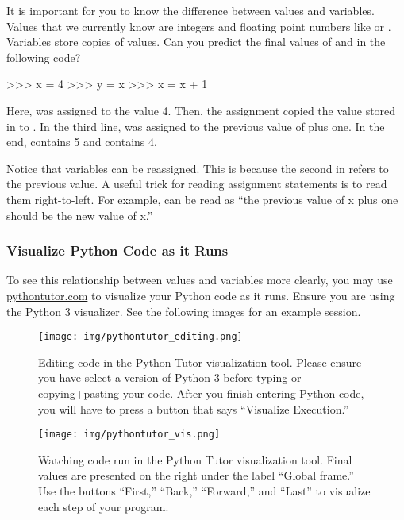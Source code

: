 \documentclass[11pt]{cselabheader}
\begin{document}
It is important for you to know the difference between values and
variables.  Values that we currently know are integers and floating
point numbers like  or .
Variables store copies of values. Can you predict the final values of
 and  in the following code?

\begin{pyconcode}
>>> x = 4
>>> y = x
>>> x = x + 1

\end{pyconcode}

Here,  was assigned to the value 4.
Then, the assignment  copied the value
stored in  to .
In the third line,  was assigned to the previous value
of  plus one.
In the end,  contains 5 and  contains 4.

Notice that variables can be reassigned.
This is because the second  in 
refers to the previous value.
A useful trick for reading assignment statements is to read them
right-to-left. For example,  can be read
as ``the previous value of x plus one should be the new value of x.''

\subsubsection{Visualize Python Code as it Runs}

To see this relationship between values and variables more
clearly, you may use \url{pythontutor.com} to visualize
your Python code as it runs. Ensure you are using the Python 3
visualizer. See the following images for an example session.

\begin{figure}[H]
  \texttt{[image: img/pythontutor\_editing.png]}
  \caption{Editing code in the Python Tutor visualization tool. Please ensure
    you have select a version of Python 3 before typing or copying+pasting
    your code. After you finish entering Python code, you will have to
    press a button that says ``Visualize Execution.''}
\end{figure}

\begin{figure}[H]
  \texttt{[image: img/pythontutor\_vis.png]}
  \caption{Watching code run in the Python Tutor visualization tool.
    Final values are presented on the right under the label ``Global frame.''
    Use the buttons ``First,'' ``Back,'' ``Forward,'' and ``Last'' to
    visualize each step of your program.}
\end{figure}
\end{document}
